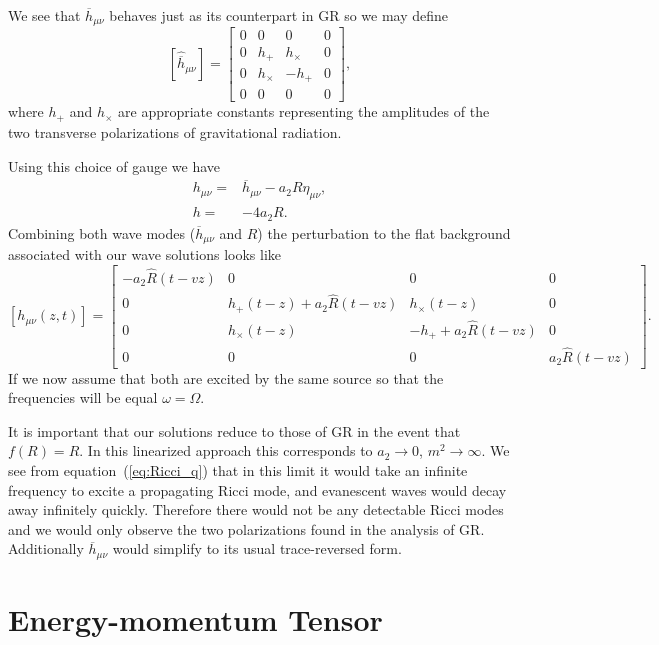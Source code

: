 \documentclass[a4paper, 11pt, titlepage, twoside]{report}
\newcommand{\eqnref}[1]{equation~(\ref{eq:#1})}
\begin{document}
We see that $\overline{h}_{\mu\nu}$ behaves just as its counterpart in GR so we may define
\begin{equation}
\left[\hat{\overline{h}}_{\mu\nu}\right] =
\begin{bmatrix}
0 & 0 & 0 & 0\\
0 & h_+ & h_\times & 0\\
0 & h_\times & -h_+ & 0\\
0 & 0 & 0 & 0
\end{bmatrix},
\end{equation}
where $h_+$ and  $h_\times$ are appropriate constants representing the amplitudes of the two transverse polarizations of gravitational radiation.

Using this choice of gauge we have
\begin{align}
h_{\mu\nu} = {} & \overline{h}_{\mu\nu} - a_2 R\eta_{\mu\nu},\\
h = {} & -4a_2R.
\label{eq:gauge}
\end{align}
Combining both wave modes ($\overline{h}_{\mu\nu}$ and $R$) the perturbation to the flat background associated with our wave solutions looks like
\begin{equation}
\left[{h}_{\mu\nu}(z,t)\right] =
\begin{bmatrix}
-a_2\hat{R}(t - vz) & 0 & 0 & 0\\
0 & h_+(t - z) + a_2\hat{R}(t - vz) & h_\times(t - z) & 0\\
0 & h_\times(t - z) & -h_+ + a_2\hat{R}(t - vz) & 0\\
0 & 0 & 0 & a_2\hat{R}(t - vz)
\end{bmatrix}.
\end{equation}
If we now assume that both are excited by the same source so that the frequencies will be equal $\omega = \Omega$.

It is important that our solutions reduce to those of GR in the event that $f(R) = R$. In this linearized approach this corresponds to $a_2 \rightarrow 0$, $m^2 \rightarrow \infty$. We see from \eqnref{Ricci_q} that in this limit it would take an infinite frequency to excite a propagating Ricci mode, and evanescent waves would decay away infinitely quickly. Therefore there would not be any detectable Ricci modes and we would only observe the two polarizations found in the analysis of GR. Additionally $\overline{h}_{\mu\nu}$ would simplify to its usual trace-reversed form.

\section{Energy-momentum Tensor}
\end{document}
